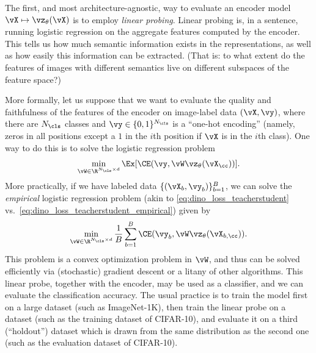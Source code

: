 \documentclass[../../book-main.tex]{subfiles}
\begin{document}
The first, and most architecture-agnostic, way to evaluate an encoder
model \(\vX \mapsto \vz_{\theta}(\vX)\) is to employ \textit{linear
probing}. Linear probing is, in a sentence, running logistic
regression on the aggregate features computed by the encoder. This
tells us how much semantic information exists in the representations,
as well as how easily this information can be extracted. (That is: to
what extent do the features of images with different semantics live
on different subspaces of the feature space?)

More formally, let us suppose that we want to evaluate the quality
and faithfulness of the features of the encoder on image-label data
\((\vX, \vy)\), where there are \(N_{\cls}\) classes and \(\vy \in
\{0, 1\}^{N_{\cls}}\) is a ``one-hot encoding'' (namely, zeros in all
positions except a \(1\) in the \(i\)th position if \(\vX\) is in the
\(i\)th class). One way to do this is to solve the logistic regression problem
\begin{equation}\label{eq:linear_probing}
\min_{\vW \in \R^{N_{\cls} \times d}}\Ex[\CE(\vy, \vW \vz_{\theta}(\vX_{\cc}))].
\end{equation}
More practically, if we have labeled data \(\{(\vX_{b}, \vy_{b})\}_{b
= 1}^{B}\), we can solve the \textit{empirical} logistic regression
problem (akin to \eqref{eq:dino_loss_teacherstudent}
vs.~\eqref{eq:dino_loss_teacherstudent_empirical}) given by
\begin{equation}\label{eq:linear_probing_empirical}
\min_{\vW \in \R^{N_{\cls} \times d}}\frac{1}{B}\sum_{b =
1}^{B}\CE(\vy_{b}, \vW \vz_{\theta}(\vX_{b, \cc})).
\end{equation}
This problem is a convex optimization problem in \(\vW\), and thus
can be solved efficiently via (stochastic) gradient descent or a
litany of other algorithms. This linear probe, together with the
encoder, may be used as a classifier, and we can evaluate the
classification accuracy. The usual practice is to train the model
first on a large dataset (such as ImageNet-1K), then train the linear
probe on a dataset (such as the training dataset of CIFAR-10), and
evaluate it on a third (``holdout'') dataset which is drawn from the
same distribution as the second one (such as the evaluation dataset
of CIFAR-10).
\end{document}
